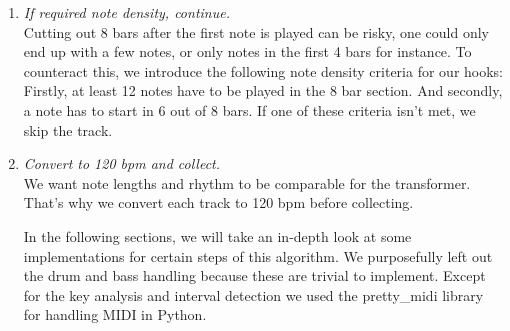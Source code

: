 \documentclass[a4paper,12pt]{extarticle}
\begin{document}
\begin{enumerate}
    \item \textit{If required note density, continue.}\\[0.2cm]
    Cutting out 8 bars after the first note is played can be risky, one could only end up with a few notes, or only notes in the first 4 bars for instance. To counteract this, we introduce the following note density criteria for our hooks:
    Firstly, at least 12 notes have to be played in the 8 bar section. And secondly, a note has to start in 6 out of 8 bars. If one of these criteria isn't met, we skip the track.
    \item \textit{Convert to 120 bpm and collect.} \\[0.2cm]
    We want note lengths and rhythm to be comparable for the transformer. That's why we convert each track to 120 bpm before collecting.

In the following sections, we will take an in-depth look at some implementations for certain steps of this algorithm. We purposefully left out the drum and bass handling because these are trivial to implement. Except for the key analysis and interval detection we used the pretty\_midi library for handling MIDI in Python.
\end{enumerate}
\end{document}

